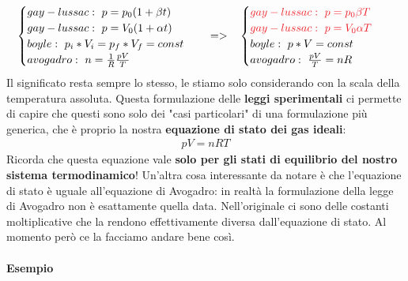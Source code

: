                     \begin{align*}
                        &\begin{cases}
                            gay-lussac:\ p=p_0(1+\beta t)\\
                            gay-lussac:\ p=V_0(1+\alpha t)\\
                            boyle:\ p_i*V_i = p_f*V_f = const\\
                            avogadro:\ n=\frac{1}{R}\frac{pV}{T}\\
                        \end{cases}&&=>
                        &&\begin{cases}
                            \textcolor{Red}{gay-lussac:\ p=p_0\beta T}\\
                            \textcolor{Red}{gay-lussac:\ p=V_0\alpha T}\\
                            boyle:\ p*V=const\\
                            avogadro:\ \frac{pV}{T}=nR\\
                        \end{cases}
                    \end{align*}
                    Il significato resta sempre lo stesso, le stiamo solo considerando con la scala della temperatura assoluta. Questa formulazione delle \textbf{leggi sperimentali} ci permette di capire che questi sono solo dei "casi particolari" di una formulazione più generica, che è proprio la nostra \textbf{equazione di stato dei gas ideali}:
                    \begin{align*}
                        pV=nRT
                    \end{align*}
                    Ricorda che questa equazione vale \textbf{solo per gli stati di equilibrio del nostro sistema termodinamico}! Un'altra cosa interessante da notare è che l'equazione di stato è uguale all'equazione di Avogadro: in realtà la formulazione della legge di Avogadro non è esattamente quella data. Nell'originale ci sono delle costanti moltiplicative che la rendono effettivamente diversa dall'equazione di stato. Al momento però ce la facciamo andare bene così.

                \paragraph{Esempio}


